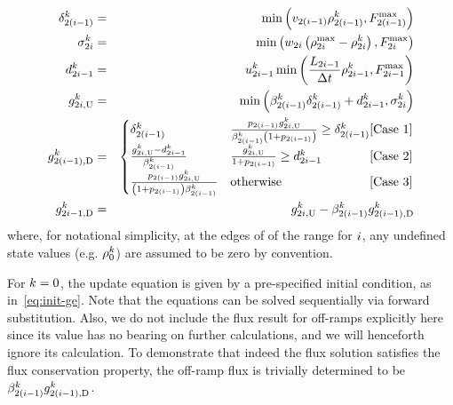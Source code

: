 \begin{eqnarray}
\demand_{2\left(\link-1\right)}^{\tind} & = & \min\left(\ffspeed_{2\left(i-1\right)}\densitydiscrete{2\left(\link-1\right)}{\tind},F_{2\left(\link-1\right)}^{\max}\right)\label{eq:first-ramp}\\
\supply_{2\link}^{\tind} & = & \min\left(\congspeed_{2i}\left(\density_{2i}^{\max}-\densitydiscrete{2\link}{\tind}\right),F_{2i}^{\max}\right)\label{eq:supply}\\
\rampDemand_{2\link-1}^{\tind} & = & \ramp_{2\link-1}^{\tind}\min\left(\frac{\length_{2\link-1}}{\Delta t}\densitydiscrete{2\link-1}{\tind},F_{2i-1}^{\max}\right)\label{eq:ramp-eqn}\\
\fin{2\link}{\tind} & = & \min\left(\splitratio_{2\left(\link-1\right)}^{\tind}\demand_{2\left(\link-1\right)}^{\tind}+\rampDemand_{2\link-1}^{\tind},\supply_{2\link}^{\tind}\right)\label{eq:fin}\\
\fout{2\left(\link-1\right)}{\tind} & = & \begin{cases}
\demand_{2\left(\link-1\right)}^{\tind} & \frac{p_{2(\link-1)}\fin{2\link}{\tind}}{\splitratio_{2\left(\link-1\right)}^{\tind}\left(1+p_{2(\link-1)}\right)}\ge\demand_{2\left(\link-1\right)}^{\tind}\hfill\text{[Case 1]}\\
\frac{\fin{2\link}{\tind}-\rampDemand_{2\link-1}^{\tind}}{\splitratio_{2\left(\link-1\right)}^{\tind}} & \frac{\fin{2\link}{\tind}}{1+p_{2(\link-1)}}\ge\rampDemand_{2\link-1}^{\tind}\hfill\text{[Case 2}]\\
\frac{p_{2(\link-1)}\fin{2\link}{\tind}}{\left(1+p_{2(\link-1)}\right)\splitratio_{2\left(\link-1\right)}^{\tind}} & \text{otherwise}\hfill[\text{Case 3]}
\end{cases}\label{eq:merge}\\
\fout{2\link-1}{\tind} & = & \fin{2\link}{\tind}-\splitratio_{2\left(\link-1\right)}^{\tind}\fout{2\left(\link-1\right)}{\tind}\label{eq:last-ramp}
\end{eqnarray}
where, for notational simplicity, at the edges of of the range for
$i$, any undefined state values (e.g. $\rho_{0}^{k}$)
are assumed to be zero by convention. 

For $k=0$, the update equation is given by a pre-specified initial
condition, as in~\eqref{eq:init-ge}. Note that the equations can
be solved sequentially via forward substitution. Also, we do not include
the flux result for off-ramps explicitly here since its value has no
bearing on further calculations, and we will henceforth ignore its
calculation. To demonstrate that indeed the flux solution satisfies
the flux conservation property, the off-ramp flux is trivially determined
to be $\beta_{2\left(i-1\right)}^{k}g_{2\left(i-1\right),\text{D}}^{k}$.



